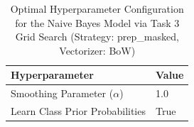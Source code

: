 \begin{table}[H]
    \centering
    \caption{Optimal Hyperparameter Configuration for the Naive Bayes Model via Task 3 Grid Search (Strategy: prep_masked, Vectorizer: BoW)}
    \label{tab:task3_mnb_hyperparameters}
    \small
    \begin{tabular}{ll}
    \toprule
    \textbf{Hyperparameter} & \textbf{Value} \\
    \midrule
    Smoothing Parameter ($\alpha$) & 1.0 \\
    Learn Class Prior Probabilities & True \\
    \bottomrule
    \end{tabular}
    \end{table}
